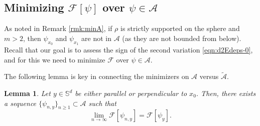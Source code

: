 \documentclass[11pt]{amsart}
\newtheorem{lemma}{Lemma}[section]
\newcommand{\bbs}{\mathbb S}
\newcommand{\calA}{\mathcal{A}}
\newcommand{\calF}{\mathcal{F}}
\newcommand{\dm}{d} %
\begin{document}
\subsection{Minimizing $\calF[\psi]$ over $\psi \in \calA$} 

As noted in Remark \ref{rmk:minA}, if $\rho$ is strictly supported on the sphere and $m>2$, then $\psi_{x_0}$ and $\psi_{x_1}$ are not in $\mathcal{A}$ (as they are not bounded from below). Recall that our goal is to assess the sign of the second variation \eqref{eqn:d2Edeps-0}, and for this we need to minimize $\calF$ over $\psi \in \calA$.

The following lemma is key in connecting the minimizers on $\calA$ versus $\tilde{\calA}$.

\begin{lemma}\label{lem:approx} Let $y\in \bbs^\dm$ be either parallel or perpendicular to $x_0$. Then, there exists a sequence $\{\psi_{n, y}\}_{n\geq1}\subset \mathcal{A}$ such that
\[
\lim_{n\to\infty}\mathcal{F}[\psi_{n,y}]=\mathcal{F}[\psi_{y}].
\]
\end{lemma}
\end{document}
